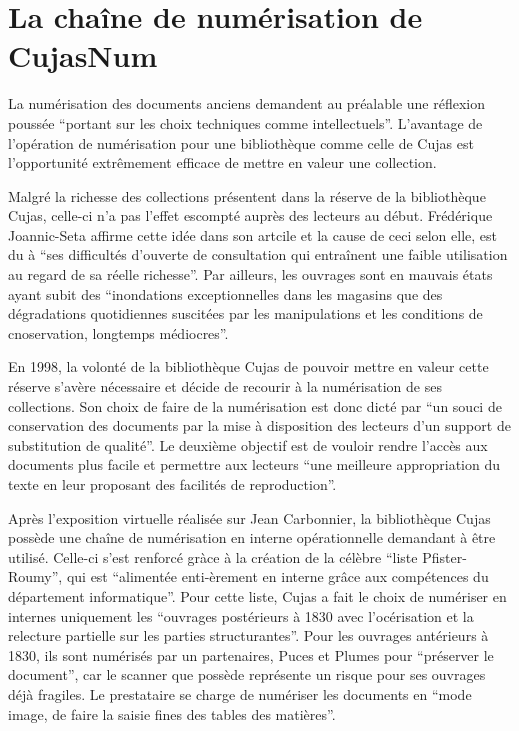 \section[chaîne de numérisation]{La chaîne de numérisation de CujasNum}

La numérisation des documents anciens demandent au préalable une réflexion poussée \enquote{portant sur les choix techniques comme intellectuels}. L'avantage de l'opération de numérisation pour une bibliothèque comme celle de Cujas est l'opportunité extrêmement efficace de mettre en valeur une collection.

Malgré la richesse des collections présentent dans la réserve de la bibliothèque Cujas, celle-ci n'a pas l'effet escompté auprès des lecteurs au début. Frédérique Joannic-Seta affirme cette idée dans son artcile et la cause de ceci selon elle, est du à \enquote{ses difficultés d'ouverte de consultation qui entraînent une faible utilisation au regard de sa réelle richesse}. Par ailleurs, les ouvrages sont en mauvais états ayant subit des \enquote{inondations exceptionnelles dans les magasins que des dégradations quotidiennes suscitées par les manipulations et les conditions de cnoservation, longtemps médiocres}. 

En 1998, la volonté de la bibliothèque Cujas de pouvoir mettre en valeur cette réserve s'avère nécessaire et décide de recourir à la numérisation de ses collections. Son choix de faire de la numérisation est donc dicté par \enquote{un souci de conservation des documents par la mise à disposition des lecteurs d'un support de substitution de qualité}. Le deuxième objectif est de vouloir rendre l'accès aux documents plus facile et permettre aux lecteurs \enquote{une meilleure appropriation du texte en leur proposant des facilités de reproduction}. 

Après l'exposition virtuelle réalisée sur Jean Carbonnier, la bibliothèque Cujas possède une chaîne de numérisation en interne opérationnelle demandant à être utilisé. Celle-ci s'est renforcé gràce à la création de la célèbre \enquote{liste Pfister-Roumy}, qui est \enquote{alimentée enti-èrement en interne grâce aux compétences du département informatique}. Pour cette liste, Cujas a fait le choix de numériser en internes uniquement les \enquote{ouvrages postérieurs à 1830 avec l'océrisation et la relecture partielle sur les parties structurantes}. Pour les ouvrages antérieurs à 1830, ils sont numérisés par un partenaires, Puces et Plumes pour \enquote{préserver le document}, car le scanner que possède représente un risque pour ses ouvrages déjà fragiles. Le prestataire se charge de numériser les documents en \enquote{mode image, de faire la saisie fines des tables des matières}. 


